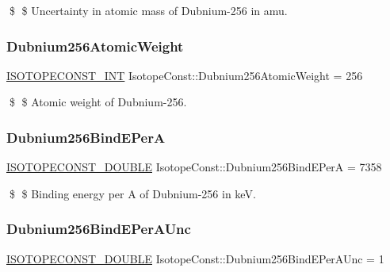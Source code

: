 \$ \$ Uncertainty in atomic mass of Dubnium-\/256 in amu. \mbox{\label{group___isotope_const-_dubnium-_db256_gaed1876d4071fd957476f9740dbd2c1ed}} 
\subsubsection{\texorpdfstring{Dubnium256\+Atomic\+Weight}{Dubnium256AtomicWeight}}
{\footnotesize\ttfamily \mbox{\hyperlink{group___isotope_const-_macros_ga5f18360b3e99483a35c32d789e62621c}{I\+S\+O\+T\+O\+P\+E\+C\+O\+N\+S\+T\+\_\+\+I\+NT}} Isotope\+Const\+::\+Dubnium256\+Atomic\+Weight = 256}

\$ \$ Atomic weight of Dubnium-\/256. \mbox{\label{group___isotope_const-_dubnium-_db256_gabb2c488b1c829ca793de4b00ce10a8bf}} 
\subsubsection{\texorpdfstring{Dubnium256\+Bind\+E\+PerA}{Dubnium256BindEPerA}}
{\footnotesize\ttfamily \mbox{\hyperlink{group___isotope_const-_macros_ga8f45a7272ce02c0b4c65c44636ed719a}{I\+S\+O\+T\+O\+P\+E\+C\+O\+N\+S\+T\+\_\+\+D\+O\+U\+B\+LE}} Isotope\+Const\+::\+Dubnium256\+Bind\+E\+PerA = 7358}

\$ \$ Binding energy per A of Dubnium-\/256 in keV. \mbox{\label{group___isotope_const-_dubnium-_db256_gac424f0b3a47b6395bda9a78175900da3}} 
\subsubsection{\texorpdfstring{Dubnium256\+Bind\+E\+Per\+A\+Unc}{Dubnium256BindEPerAUnc}}
{\footnotesize\ttfamily \mbox{\hyperlink{group___isotope_const-_macros_ga8f45a7272ce02c0b4c65c44636ed719a}{I\+S\+O\+T\+O\+P\+E\+C\+O\+N\+S\+T\+\_\+\+D\+O\+U\+B\+LE}} Isotope\+Const\+::\+Dubnium256\+Bind\+E\+Per\+A\+Unc = 1}

